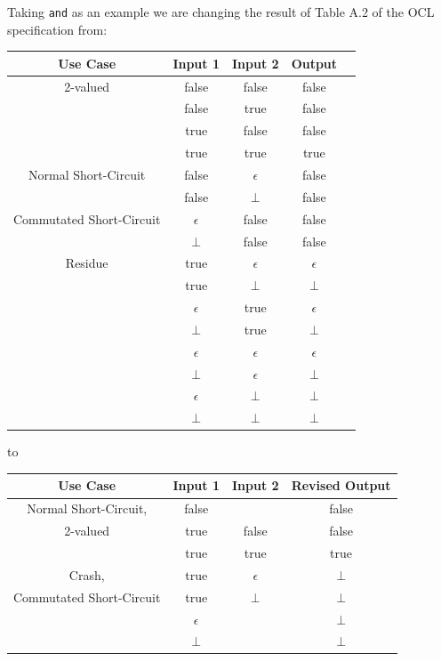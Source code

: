 \documentclass{llncs}
\begin{document}

Taking \verb|and| as an example we are changing the result of Table A.2 of the OCL specification from:

\begin{center}
	\begin{tabular}{|c||c|c||c||c|}
		\hline
		Use Case & Input 1 & Input 2 & Output \\
		\hline
		\hline
		2-valued & false & false & false \\
		& false & true & false \\
		& true & false & false \\
		& true & true & true \\
		\hline
		Normal Short-Circuit & false & $\epsilon$ & false \\
		& false & $\bot$ & false \\
		Commutated Short-Circuit & $\epsilon$ & false & false \\
		& $\bot$ & false & false \\
		\hline
		Residue & true & $\epsilon$ & $\epsilon$ \\
		 & true & $\bot$ & $\bot$ \\
		& $\epsilon$ & true & $\epsilon$ \\
		& $\bot$ & true & $\bot$ \\
		& $\epsilon$ & $\epsilon$ & $\epsilon$ \\
		& $\bot$ & $\epsilon$ & $\bot$ \\
		& $\epsilon$ & $\bot$ & $\bot$ \\
		& $\bot$ & $\bot$ & $\bot$ \\
		\hline
	\end{tabular}
\end{center}

to

\begin{center}
	\begin{tabular}{|c||c|c||c|}
		\hline
		Use Case & Input 1 & Input 2 & Revised Output \\
		\hline
		\hline
		Normal Short-Circuit, & false &  & false \\
		2-valued & true & false & false \\
		& true & true & true \\
		\hline
		Crash, & true & $\epsilon$ & $\bot$ \\
		Commutated Short-Circuit  & true & $\bot$ & $\bot$ \\
		& $\epsilon$ & & $\bot$ \\
		& $\bot$ & & $\bot$ \\
		\hline
	\end{tabular}
\end{center}
\end{document}
